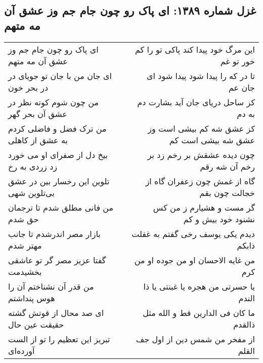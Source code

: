 \begin{center}
\section*{غزل شماره ۱۳۸۹: ای پاک رو چون جام جم وز عشق آن مه متهم}
\label{sec:1389}
\begin{longtable}{l p{0.5cm} r}
ای پاک رو چون جام جم وز عشق آن مه متهم
&&
این مرگ خود پیدا کند پاکی تو را کم خور تو غم
\\
ای جان من با جان تو جویای در در بحر خون
&&
تا در که را پیدا شود پیدا شود ای جان عم
\\
من چون شوم کوته نظر در عشق آن بحر گهر
&&
کز ساحل دریای جان آید بشارت دم به دم
\\
من ترک فضل و فاضلی کردم به عشق از کاهلی
&&
کز عشق شه کم بیشی است وز عشق شه بیشی است کم
\\
بیخ دل از صفرای او می خورد زد زردی به رخ
&&
چون دیده عشقش بر رخم زد بر رخم آن شه رقم
\\
تلوین این رخسار بین در عشق بی‌تلوین شهی
&&
گاه از غمش چون زعفران گاه از خجالت چون بقم
\\
من فانی مطلق شدم تا ترجمان حق شدم
&&
گر مست و هشیارم ز من کس نشنود خود بیش و کم
\\
بازار مصر اندرشدم تا جانب مهتر شدم
&&
دیدم یکی یوسف رخی گفتم به غفلت ذابکم
\\
گفتا عزیز مصر گر تو عاشقی بخشیدمت
&&
من غایه الاحسان او من جوده او من کرم
\\
من قدر آن نشناختم آن را هوس پنداشتم
&&
یا حسرتی من هجره یا غبنتی یا ذا الندم
\\
ای صد محال از قوتش گشته حقیقت عین حال
&&
ما کان فی الدارین قط و الله مثل ذالقدم
\\
تبریز این تعظیم را تو از الست آورده‌ای
&&
از مفخر من شمس دین از اول جف القلم
\\
\end{longtable}
\end{center}
